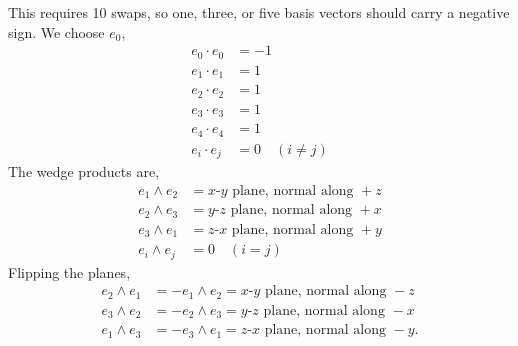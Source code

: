 	This requires 10 swaps, so one, three, or five basis vectors should carry a negative sign. We choose $e_0$,
	\begin{align*}
	e_0 \cdot e_0 & = -1\\
	e_1 \cdot e_1 & = 1\\
	e_2 \cdot e_2 & = 1\\
	e_3 \cdot e_3 & = 1\\		
	e_4 \cdot e_4 & = 1\\
	e_i \cdot e_j & = 0 \quad \left(i\neq j\right)
	\end{align*}	
	The wedge products are,	
	\begin{align*}		
	e_1 \wedge e_2 & = x\text{-}y\text{ plane, normal along }+z\\
	e_2 \wedge e_3 & = y\text{-}z\text{ plane, normal along }+x\\
	e_3 \wedge e_1 & = z\text{-}x\text{ plane, normal along }+y\\
	e_i \wedge e_j & = 0 \quad \left(i=j\right)
	\end{align*}
	Flipping the planes,
	\begin{align*}		
	e_2 \wedge e_1 & = -e_1 \wedge e_2 = x\text{-}y\text{ plane, normal along }-z\\
	e_3 \wedge e_2 & = -e_2 \wedge e_3 = y\text{-}z\text{ plane, normal along }-x\\
	e_1 \wedge e_3 & = -e_3 \wedge e_1 = z\text{-}x\text{ plane, normal along }-y.
	\end{align*}	